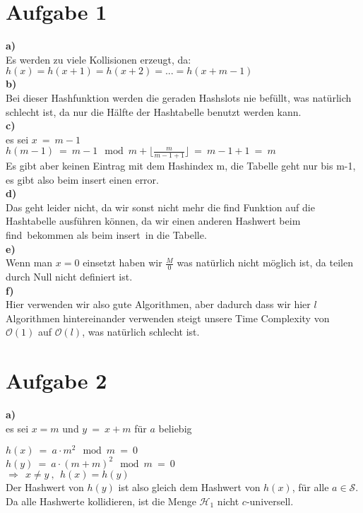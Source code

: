 \documentclass[12pt,a4paper,headsepline]{scrreprt}
\begin{document}


\section*{Aufgabe 1}
\textbf{a)}\\
Es werden zu viele Kollisionen erzeugt, da:\\

$h(x)=h(x+1)=h(x+2)=...=h(x+m-1)$\\

\textbf{b)}\\
Bei dieser Hashfunktion werden die geraden Hashslots nie befüllt, was natürlich schlecht ist, da nur die Hälfte der Hashtabelle benutzt werden kann.\\

\textbf{c)}\\
es sei $x~=~m-1$\\

$h(m-1)~=~m-1 \mod m + \lfloor \frac{m}{m-1+1} \rfloor~=~m-1+1~=~m$\\

Es gibt aber keinen Eintrag mit dem Hashindex m, die Tabelle geht nur bis m-1, es gibt also beim insert einen error.\\

\textbf{d)}\\
Das geht leider nicht, da wir sonst nicht mehr die find Funktion auf die Hashtabelle ausführen können, da wir einen anderen Hashwert beim \textquotedbl find\textquotedbl ~bekommen als beim \textquotedbl insert\textquotedbl ~in die Tabelle.\\

\textbf{e)}\\
Wenn man $x = 0$ einsetzt haben wir $\frac{M}{0}$ was natürlich nicht möglich ist, da teilen durch Null nicht definiert ist.\\


\textbf{f)}\\
Hier verwenden wir also gute Algorithmen, aber dadurch dass wir hier $l$ Algorithmen hintereinander verwenden steigt unsere Time Complexity von $\mathcal{O}(1)$ auf $\mathcal{O}(l)$, was natürlich schlecht ist.
\clearpage

\section*{Aufgabe 2}
\textbf{a)}\\
es sei $x=m$ und $y~=~x+m$ für $a$ beliebig

$h(x)~=~a \cdot m^2 \mod m~=~0$\\
$h(y)~=~a \cdot(m+m)^2 \mod m~=~ 0$\\
$\Rightarrow~~x\neq y~, ~~h(x)=h(y)$\\

Der Hashwert von $h(y)$ ist also gleich dem Hashwert von $h(x)$, für alle $a\in\mathcal{S}$. Da alle Hashwerte kollidieren, ist die Menge $\mathcal{H}_1$ nicht $c$-universell.\\
\end{document}
